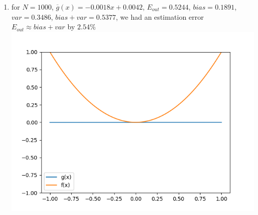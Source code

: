 \documentclass{article}
\begin{document}
\begin{enumerate}
\begin{enumerate}[label=(\alph*)]
            \item for $N = 1000$, $\overline{g}(x) = -0.0018x + 0.0042$, $E_{out} = 0.5244$, $bias = 0.1891$, $var = 0.3486$, $bias + var = 0.5377$, we had an estimation error $E_{out} \approx bias + var$ by $2.54\%$\\
            \includegraphics[scale=0.5]{images/2_24.png}
        \end{enumerate}
    \end{enumerate}
\end{document}
